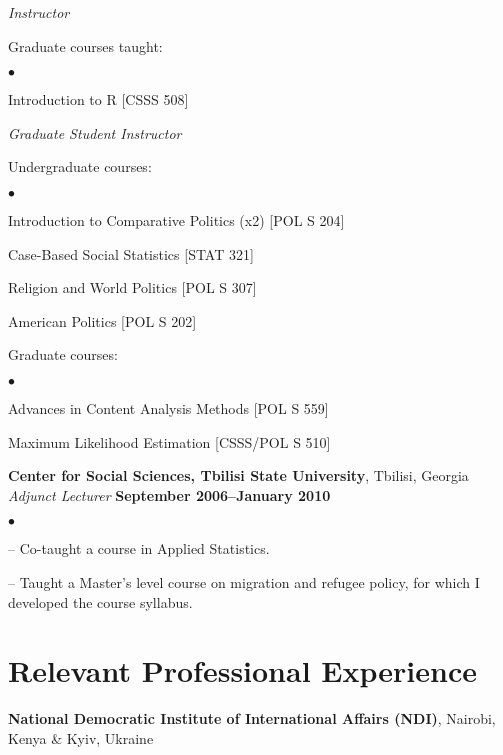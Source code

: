 \documentclass[margin,line]{res}
\newenvironment{list1}{
  \begin{list}{\ding{113}}{%
      \setlength{\itemsep}{0in}
      \setlength{\parsep}{0in} \setlength{\parskip}{0in}
      \setlength{\topsep}{0in} \setlength{\partopsep}{0in} 
      \setlength{\leftmargin}{0.17in}}}{\end{list}}
\newenvironment{list2}{
  \begin{list}{$\bullet$}{%
      \setlength{\itemsep}{0in}
      \setlength{\parsep}{0in} \setlength{\parskip}{0in}
      \setlength{\topsep}{0in} \setlength{\partopsep}{0in} 
      \setlength{\leftmargin}{0.2in}}}{\end{list}}
\begin{document}
{\begin{resume}
{\em Instructor}\\
\vspace{-.1in}
\begin{list1}
 \item[] Graduate courses taught:
   \begin{list2}
   \item[] Introduction to R  [CSSS 508]
\end{list2}
\end{list1}

{\em Graduate Student Instructor} \\
\vspace{-.1in}
\begin{list1}
 \item[] Undergraduate courses:
   \begin{list2}
   \item[] Introduction to Comparative Politics (x2)
   [POL S 204]
   \item[] Case-Based Social Statistics [STAT 321]
   \item[]Religion and World Politics [POL S 307]
     \item[] American Politics [POL S 202] 
\end{list2}
\item[] Graduate courses:
   \begin{list2}
     \item [] Advances in Content Analysis Methods [POL S 559]
     \item [] Maximum Likelihood Estimation [CSSS/POL S 510]
\end{list2}
\end{list1}

{\bf Center for Social Sciences, Tbilisi State University}, Tbilisi,
Georgia \\
\vspace{-.1cm}
{\em Adjunct Lecturer} \hfill {\bf September 2006--January 2010}\\
\begin{list2}
\item[]-- Co-taught a course in Applied Statistics.
\item[]-- Taught a Master’s level course on migration and refugee policy, for which I developed the course syllabus.
\end{list2}



\section{\sc Relevant Professional Experience}
{\bf National Democratic Institute of International Affairs (NDI)},
Nairobi, Kenya \& Kyiv, Ukraine


\end{resume}}
\end{document}
